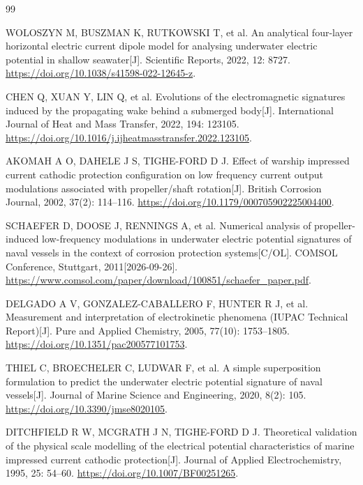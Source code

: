 \begingroup
{}\linespread{1.23}\selectfont
\begin{thebibliography}{99}
\setlength{\itemsep}{6bp}

WOLOSZYN M, BUSZMAN K, RUTKOWSKI T, et al.
An analytical four-layer horizontal electric current dipole model for analysing underwater electric potential in shallow seawater[J].
Scientific Reports, 2022, 12: 8727.
\url{https://doi.org/10.1038/s41598-022-12645-z}.

CHEN Q, XUAN Y, LIN Q, et al.
Evolutions of the electromagnetic signatures induced by the propagating wake behind a submerged body[J].
International Journal of Heat and Mass Transfer, 2022, 194: 123105.
\url{https://doi.org/10.1016/j.ijheatmasstransfer.2022.123105}.

AKOMAH A O, DAHELE J S, TIGHE-FORD D J.
Effect of warship impressed current cathodic protection configuration on low frequency current output modulations associated with propeller/shaft rotation[J].
British Corrosion Journal, 2002, 37(2): 114--116.
\url{https://doi.org/10.1179/000705902225004400}.

SCHAEFER D, DOOSE J, RENNINGS A, et al.
Numerical analysis of propeller-induced low-frequency modulations in underwater electric potential signatures of naval vessels in the context of corrosion protection systems[C/OL].
COMSOL Conference, Stuttgart, 2011[2026-09-26].
\url{https://www.comsol.com/paper/download/100851/schaefer_paper.pdf}.

DELGADO A V, GONZALEZ-CABALLERO F, HUNTER R J, et al.
Measurement and interpretation of electrokinetic phenomena (IUPAC Technical Report)[J].
Pure and Applied Chemistry, 2005, 77(10): 1753--1805.
\url{https://doi.org/10.1351/pac200577101753}.

THIEL C, BROECHELER C, LUDWAR F, et al.
A simple superposition formulation to predict the underwater electric potential signature of naval vessels[J].
Journal of Marine Science and Engineering, 2020, 8(2): 105.
\url{https://doi.org/10.3390/jmse8020105}.

DITCHFIELD R W, MCGRATH J N, TIGHE-FORD D J.
Theoretical validation of the physical scale modelling of the electrical potential characteristics of marine impressed current cathodic protection[J].
Journal of Applied Electrochemistry, 1995, 25: 54--60.
\url{https://doi.org/10.1007/BF00251265}.


\end{thebibliography}
